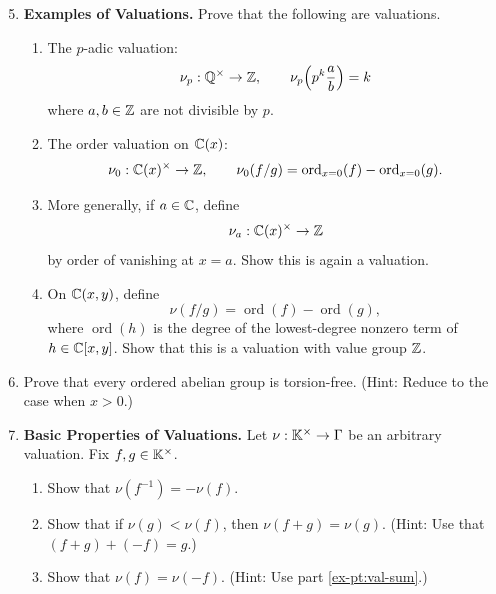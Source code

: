 \documentclass[12pt,reqno]{amsart}
\begin{document}
\begin{enumerate}[leftmargin=*]
  \setcounter{enumi}{4}

\item \textbf{Examples of Valuations.} Prove that the following are valuations.
	\begin{enumerate}[label=(\alph*),ref=\theenumi\alph*]
	\item The $p$-adic valuation:
	\[
	\nu_p:\mathbb{Q}^\times \to \mathbb{Z},
	\qquad
	\nu_p\!\left(p^k\frac{a}{b}\right)=k
	\]
	where $a,b\in \mathbb{Z}$ are not divisible by $p$.
	
	\item The order valuation on $\mathbb{C}(x)$:
	\[
	\nu_0:\mathbb{C}(x)^\times \to \mathbb{Z},
	\qquad
	\nu_0(f/g)=\operatorname{ord}_{x=0}(f)-\operatorname{ord}_{x=0}(g).
	\]
	
	\item More generally, if $a\in \mathbb{C}$, define
	\[
	\nu_a:\mathbb{C}(x)^\times \to \mathbb{Z}
	\]
	by order of vanishing at $x=a$. Show this is again a valuation.
	
	\item On $\mathbb{C}(x,y)$, define
	\[
	\nu(f/g)=\operatorname{ord}(f)-\operatorname{ord}(g),
	\]
	where $\operatorname{ord}(h)$ is the degree of the lowest-degree nonzero term of $h\in \mathbb{C}[x,y]$. Show that this is a valuation with value group $\mathbb{Z}$.
	\end{enumerate}
	
\item Prove that every ordered abelian group is torsion-free. (Hint: Reduce to the case when $x>0$.)

\item \textbf{Basic Properties of Valuations.} Let $\nu:\mathbb{K}^{\times} \to \Gamma$ be an arbitrary valuation. Fix $f,g \in \mathbb{K}^{\times}$.
\begin{enumerate}[label=(\alph*),ref=\theenumi\alph*]
	\item Show that $\nu(f^{-1}) = -\nu(f)$.
	\item\label{ex-pt:val-sum} Show that if $\nu(g) < \nu(f)$, then $\nu(f+g) = \nu(g).$ (Hint: Use that $(f+g) + (-f) = g$.)
	\item Show that  $\nu(f) = \nu (-f)$. (Hint: Use part \ref{ex-pt:val-sum}.)
\end{enumerate}



\end{enumerate}
\end{document}

